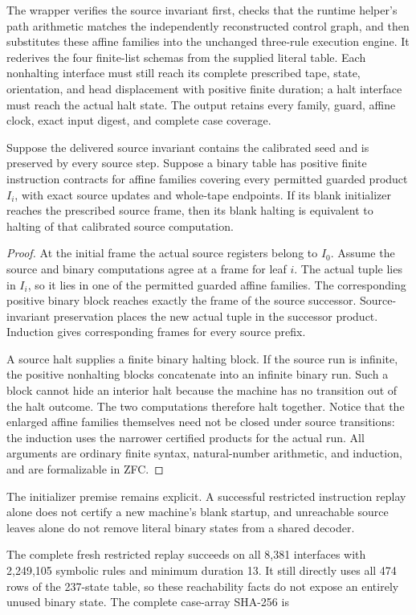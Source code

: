 The wrapper  verifies
the source invariant first, checks that the runtime helper's path arithmetic
matches the independently reconstructed control graph, and then substitutes
these affine families into the unchanged three-rule execution engine.  It
rederives the four finite-list schemas from the supplied literal table.  Each
nonhalting interface must still reach its complete prescribed tape, state,
orientation, and head displacement with positive finite duration; a halt
interface must reach the actual halt state.  The output retains every family,
guard, affine clock, exact input digest, and complete case coverage.

\begin{proposition}
Suppose the delivered source invariant contains the calibrated seed and is
preserved by every source step.  Suppose a binary table has positive finite
instruction contracts for affine families covering every permitted guarded
product $I_i$, with exact source updates and whole-tape endpoints.  If its
blank initializer reaches the prescribed source frame, then its blank halting
is equivalent to halting of that calibrated source computation.
\end{proposition}

\begin{proof}
At the initial frame the actual source registers belong to $I_0$.  Assume the
source and binary computations agree at a frame for leaf $i$.  The actual
tuple lies in $I_i$, so it lies in one of the permitted guarded affine
families.  The corresponding positive binary block reaches exactly the frame
of the source successor.  Source-invariant preservation places the new actual
tuple in the successor product.  Induction gives corresponding frames for
every source prefix.

A source halt supplies a finite binary halting block.  If the source run is
infinite, the positive nonhalting blocks concatenate into an infinite binary
run.  Such a block cannot hide an interior halt because the machine has no
transition out of the halt outcome.  The two computations therefore halt
together.  Notice that the enlarged affine families themselves need not be
closed under source transitions: the induction uses the narrower certified
products for the actual run.  All arguments are ordinary finite syntax,
natural-number arithmetic, and induction, and are formalizable in ZFC.
\end{proof}

The initializer premise remains explicit.  A successful restricted instruction
replay alone does not certify a new machine's blank startup, and unreachable
source leaves alone do not remove literal binary states from a shared decoder.

The complete fresh restricted replay succeeds on all 8,381 interfaces with 2,249,105 symbolic rules and minimum duration 13. It still directly uses all 474 rows of the 237-state table, so these reachability facts do not expose an entirely unused binary state. The complete case-array SHA-256 is
